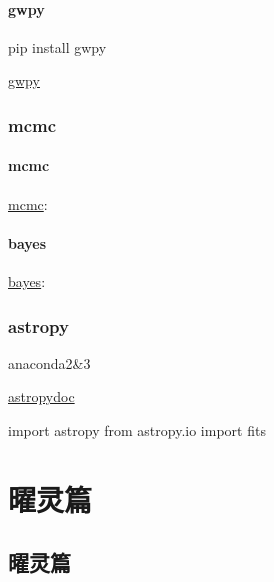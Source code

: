 \documentclass[letterpaper,10pt,english]{sphinxmanual}
\begin{document}
\subsubsection{gwpy}
\label{\detokenize{advanced/02_gwpy:id1}}
pip install gwpy

\href{https://gwpy.github.io/}{gwpy}


\subsection{mcmc}
\label{\detokenize{advanced/03_mcmc::doc}}\label{\detokenize{advanced/03_mcmc:id2}}\label{\detokenize{advanced/03_mcmc:mcmc}}

\subsubsection{mcmc}
\label{\detokenize{advanced/03_mcmc:id1}}
\href{https://bmcmc.readthedocs.io/en/latest/\#tutorial}{mcmc}:


\subsubsection{bayes}
\label{\detokenize{advanced/03_mcmc:id2}}\label{\detokenize{advanced/03_mcmc:bayes}}
\href{http://jakevdp.github.io/blog/2014/06/14/frequentism-and-bayesianism-4-bayesian-in-python/}{bayes}:


\subsection{astropy}
\label{\detokenize{advanced/04_astropy:astropy}}\label{\detokenize{advanced/04_astropy::doc}}\label{\detokenize{advanced/04_astropy:id3}}
anaconda2\&3

\href{http://docs.astropy.org/en/stable/importing\_astropy.html\#getting-started-with-sub-packages}{astropydoc}

import astropy
from  astropy.io import fits


\chapter{曜灵篇}
\label{\detokenize{poem/index::doc}}\label{\detokenize{poem/index:id1}}

\section{曜灵篇}
\label{\detokenize{poem/index:id2}}
\end{document}
